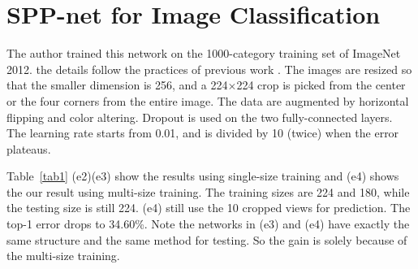 \documentclass[10pt,twocolumn,letterpaper]{article}
\begin{document}
\section{SPP-net for Image Classification}
The author trained this network on the 1000-category training set of ImageNet 2012. the details follow the practices of previous work \cite{Forsyth2010Object}. The images are resized so that the smaller dimension is 256, and a 224$\times$224 crop is picked from the center or the four corners from the entire image. The data are augmented by horizontal flipping and color altering. Dropout is used on the two  fully-connected layers. The learning rate starts from 0.01, and is divided by 10 (twice) when the error plateaus. 
\par
Table~\ref{tab1} (e2)(e3) show the results using single-size training and (e4) shows the our result using multi-size training. The training sizes are 224 and 180, while the testing size is still 224. (e4) still use the 10 cropped views for prediction. The top-1 error drops to 34.60\%. Note the networks in (e3) and (e4) have exactly the same structure and the same method for testing. So the gain is solely because of the multi-size training.


{\small


}
\end{document}

